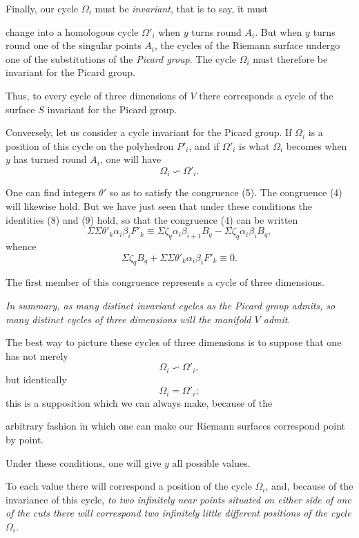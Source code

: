 \documentclass{article}
\begin{document}
Finally, our cycle $\Omega_{i}$ must be \emph{invariant}, that is to say, it must

change into a homologous cycle $\Omega'_{i}$ when $y$ turns round $A_{i}$. But when $y$ turns round one of the singular points $A_{i}$, the cycles of the Riemann surface undergo one of the substitutions of the \emph{Picard group}. The cycle $\Omega_{i}$ must therefore be invariant for the Picard group.

Thus, to every cycle of three dimensions of $V$ there corresponds a cycle of the surface $S$ invariant for the Picard group.

Conversely, let us consider a cycle invariant for the Picard group. If $\Omega_{i}$ is a position of this cycle on the polyhedron $P'_{i}$, and if $\Omega'_{i}$ is what $\Omega_{i}$ becomes when $y$ has turned round $A_{i}$, one will have
\[ \Omega_{i} \backsim \Omega'_{i}. \]

One can find integers $\theta'$ so as to satisfy the congruence (5). The congruence (4) will likewise hold. But we have just seen that under these conditions the identities (8) and (9) hold, so that the congruence (4) can be written
\[ \Sigma \Sigma \theta'_{k} \alpha_{i}\beta_{i}F'_{k} \equiv \Sigma \zeta_{q} \alpha_{i}\beta_{i+1}B_{q} - \Sigma \zeta_{q} \alpha_{i}\beta_{i}B_{q}, \]
whence
\[ \Sigma \zeta_{q} B_{q} + \Sigma \Sigma \theta'_{k} \alpha_{i}\beta_{i}F'_{k} \equiv 0. \]

The first member of this congruence represents a cycle of three dimensions.

\emph{In summary, as many distinct invariant cycles as the Picard group admits, so many distinct cycles of three dimensions will the manifold $V$ admit}.

The best way to picture these cycles of three dimensions is to suppose that one has not merely
\[ \Omega_{i} \backsim \Omega'_{i}, \]
but identically
\[ \Omega_{i} = \Omega'_{i}; \]
this is a supposition which we can always make, because of the

arbitrary fashion in which one can make our Riemann surfaces correspond point by point.

Under these conditions, one will give $y$ all possible values.

To each value there will correspond a position of the cycle $\Omega_{i}$, and, because of the invariance of this cycle, \emph{to two infinitely near points situated on either side of one of the cuts there will correspond two infinitely} \emph{little different positions of the cycle $\Omega_{i}$}.
\end{document}
